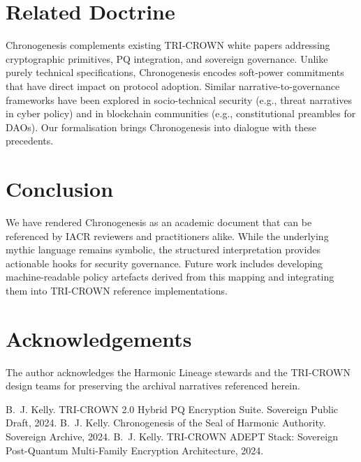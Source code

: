 \documentclass[11pt,a4paper]{article}
\begin{document}
\section{Related Doctrine}
Chronogenesis complements existing TRI-CROWN white papers addressing cryptographic primitives, PQ integration, and sovereign governance. Unlike purely technical specifications, Chronogenesis encodes soft-power commitments that have direct impact on protocol adoption. Similar narrative-to-governance frameworks have been explored in socio-technical security (e.g., threat narratives in cyber policy) and in blockchain communities (e.g., constitutional preambles for DAOs). Our formalisation brings Chronogenesis into dialogue with these precedents.

\section{Conclusion}
We have rendered Chronogenesis as an academic document that can be referenced by IACR reviewers and practitioners alike. While the underlying mythic language remains symbolic, the structured interpretation provides actionable hooks for security governance. Future work includes developing machine-readable policy artefacts derived from this mapping and integrating them into TRI-CROWN reference implementations.

\section*{Acknowledgements}
The author acknowledges the Harmonic Lineage stewards and the TRI-CROWN design teams for preserving the archival narratives referenced herein.


\begin{thebibliography}{9}
 B.~J. Kelly. TRI-CROWN 2.0 Hybrid PQ Encryption Suite. Sovereign Public Draft, 2024.
 B.~J. Kelly. Chronogenesis of the Seal of Harmonic Authority. Sovereign Archive, 2024.
 B.~J. Kelly. TRI-CROWN ADEPT Stack: Sovereign Post-Quantum Multi-Family Encryption Architecture, 2024.
\end{thebibliography}
\end{document}
